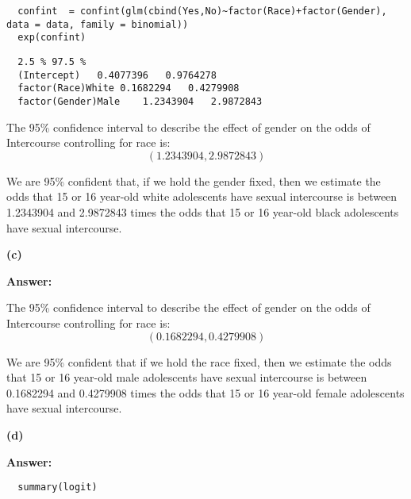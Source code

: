 \documentclass[letterpaper,11pt]{article}
\begin{document}
\begin{lstlisting}
  confint  = confint(glm(cbind(Yes,No)~factor(Race)+factor(Gender), data = data, family = binomial))
  exp(confint)
\end{lstlisting}

\begin{lstlisting}
  2.5 %	97.5 %
  (Intercept)	0.4077396	0.9764278
  factor(Race)White	0.1682294	0.4279908
  factor(Gender)Male	1.2343904	2.9872843
\end{lstlisting}

The 95\% confidence interval to describe the effect of gender on the odds of Intercourse controlling for race is:
$$(1.2343904, 2.9872843)$$

We are 95\% confident that, if we hold the gender fixed, then we estimate the odds that 15 or 16 year-old white adolescents have sexual intercourse is between 1.2343904 and 2.9872843 times the odds that 15 or 16 year-old black adolescents have sexual intercourse.

\begin{addmargin}[-1.1em]{0em}
  \textbf{(c)}\par
\end{addmargin}
\textbf{}\par
\bigbreak
\begin{addmargin}[-0.5em]{0em}
  \textbf{Answer: }
\end{addmargin}

The 95\% confidence interval to describe the effect of gender on the odds of Intercourse controlling for race is:
$$(0.1682294, 0.4279908)$$

We are 95\% confident that if we hold the race fixed, then we estimate the odds that 15 or 16 year-old male adolescents have sexual intercourse is between 0.1682294 and 0.4279908 times the odds that 15 or 16 year-old female adolescents have sexual intercourse.

\begin{addmargin}[-1.1em]{0em}
  \textbf{(d)}\par
\end{addmargin}
\textbf{}\par
\bigbreak
\begin{addmargin}[-0.5em]{0em}
  \textbf{Answer: }
\end{addmargin}

\begin{lstlisting}
  summary(logit)
\end{lstlisting}
\end{document}

